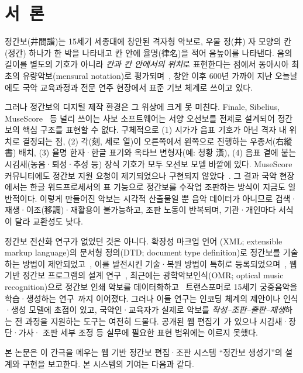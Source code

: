 \section{서\ 론}
\label{sec:intro}

정간보(井間譜)는 15세기 세종대에 창안된 격자형 악보로, 우물 정(井) 자 모양의
칸(정간) 하나가 한 박을 나타내고 칸 안에 율명(律名)을 적어 음높이를 나타낸다.
음의 길이를 별도의 기호가 아니라 \emph{칸과 칸 안에서의 위치}로 표현한다는 점에서
동아시아 최초의 유량악보(mensural notation)로 평가되며~\cite{kwon2000notation,han2024sixdragons},
창안 이후 600년 가까이 지난 오늘날에도 국악 교육과정과 전문 연주 현장에서
표준 기보 체계로 쓰이고 있다.

그러나 정간보의 디지털 제작 환경은 그 위상에 크게 못 미친다.
Finale, Sibelius, MuseScore~\cite{musescore} 등 널리 쓰이는 사보 소프트웨어는
서양 오선보를 전제로 설계되어 정간보의 핵심 구조를 표현할 수 없다.
구체적으로 (1) 시가가 음표 기호가 아닌 격자 내 위치로 결정되는 점,
(2) 각(刻, 세로 열)이 오른쪽에서 왼쪽으로 진행하는 우종서(右縱書) 배치,
(3) 율명 한자·한글 표기와 옥타브 변형자(예: 청황 潢),
(4) 음표 곁에 붙는 시김새(농음·퇴성·추성 등) 장식 기호가 모두 오선보 모델
바깥에 있다. MuseScore 커뮤니티에도 정간보 지원 요청이 제기되었으나
구현되지 않았다~\cite{musescore-jgb-request}.
그 결과 국악 현장에서는 한글 워드프로세서의 표 기능으로 정간보를 수작업
조판하는 방식이 지금도 일반적이다. 이렇게 만들어진 악보는 시각적 산출물일 뿐
음악 데이터가 아니므로 검색·재생·이조(移調)·재활용이 불가능하고,
조판 노동이 반복되며, 기관·개인마다 서식이 달라 교환성도 낮다.

정간보 전산화 연구가 없었던 것은 아니다. 확장성 마크업 언어
(XML; extensible markup language)의 문서형 정의(DTD; document type
definition)로 정간보를 기술하는 방법이 제안되었고~\cite{lee2013xml},
이를 발전시킨 기술·복원 방법이
특허로 등록되었으며~\cite{patent2017jgb}, 웹 기반 정간보 프로그램의 설계
연구~\cite{jkca2022web}, 최근에는 광학악보인식(OMR; optical music
recognition)으로 정간보 인쇄 악보를
데이터화하고~\cite{kim2025omr} 트랜스포머로 15세기 궁중음악을 학습·생성하는
연구~\cite{han2024sixdragons}까지 이어졌다. 그러나 이들 연구는 인코딩 체계의
제안이나 인식·생성 모델에 초점이 있고, 국악인·교육자가 실제로 악보를
\emph{작성--조판--출판--재생}하는 전 과정을 지원하는 도구는 여전히 드물다.
공개된 웹 편집기~\cite{jeongganbo-editor-web}가 있으나 시김새·장단·가사·
조판 세부 조정 등 실무에 필요한 표현 범위에는 이르지 못했다.

본 논문은 이 간극을 메우는 웹 기반 정간보 편집·조판 시스템
``정간보 생성기''의 설계와 구현을 보고한다. 본 시스템의 기여는 다음과 같다.

